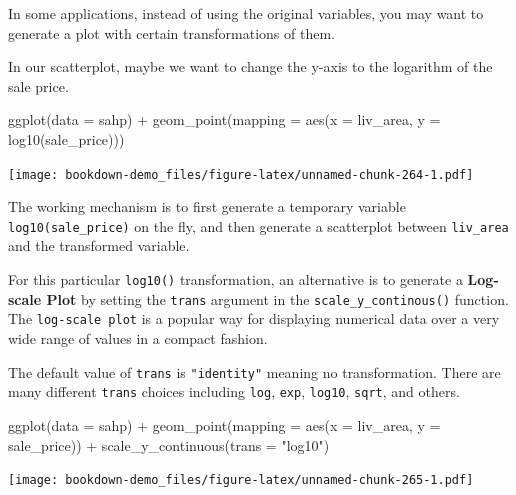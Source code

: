 \documentclass[
]{book}
\newenvironment{Shaded}{\begin{snugshade}}{\end{snugshade}}
\newcommand{\AttributeTok}[1]{\textcolor[rgb]{0.77,0.63,0.00}{#1}}
\newcommand{\FunctionTok}[1]{\textcolor[rgb]{0.00,0.00,0.00}{#1}}
\newcommand{\NormalTok}[1]{#1}
\newcommand{\SpecialCharTok}[1]{\textcolor[rgb]{0.00,0.00,0.00}{#1}}
\newcommand{\StringTok}[1]{\textcolor[rgb]{0.31,0.60,0.02}{#1}}
\begin{document}
In some applications, instead of using the original variables, you may want to generate a plot with certain transformations of them.

In our scatterplot, maybe we want to change the y-axis to the logarithm of the sale price.

\begin{Shaded}
\begin{Highlighting}[]
\FunctionTok{ggplot}\NormalTok{(}\AttributeTok{data =}\NormalTok{ sahp) }\SpecialCharTok{+} \FunctionTok{geom\_point}\NormalTok{(}\AttributeTok{mapping =} \FunctionTok{aes}\NormalTok{(}\AttributeTok{x =}\NormalTok{ liv\_area, }\AttributeTok{y =} \FunctionTok{log10}\NormalTok{(sale\_price)))}
\end{Highlighting}
\end{Shaded}

\texttt{[image: bookdown-demo\_files/figure-latex/unnamed-chunk-264-1.pdf]}

The working mechanism is to first generate a temporary variable \texttt{log10(sale\_price)} on the fly, and then generate a scatterplot between \texttt{liv\_area} and the transformed variable.

For this particular \texttt{log10()} transformation, an alternative is to generate a \textbf{Log-scale Plot} by setting the \texttt{trans} argument in the \texttt{scale\_y\_continous()} function. The \texttt{log-scale\ plot} is a popular way for displaying numerical data over a very wide range of values in a compact fashion.

The default value of \texttt{trans} is \texttt{"identity"} meaning no transformation. There are many different \texttt{trans} choices including \texttt{log}, \texttt{exp}, \texttt{log10}, \texttt{sqrt}, and others.

\begin{Shaded}
\begin{Highlighting}[]
\FunctionTok{ggplot}\NormalTok{(}\AttributeTok{data =}\NormalTok{ sahp) }\SpecialCharTok{+} \FunctionTok{geom\_point}\NormalTok{(}\AttributeTok{mapping =} \FunctionTok{aes}\NormalTok{(}\AttributeTok{x =}\NormalTok{ liv\_area, }\AttributeTok{y =}\NormalTok{ sale\_price)) }\SpecialCharTok{+}
  \FunctionTok{scale\_y\_continuous}\NormalTok{(}\AttributeTok{trans =} \StringTok{"log10"}\NormalTok{)}
\end{Highlighting}
\end{Shaded}

\texttt{[image: bookdown-demo\_files/figure-latex/unnamed-chunk-265-1.pdf]}
\end{document}
